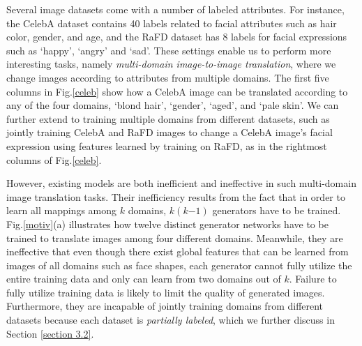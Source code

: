 \documentclass[10pt,twocolumn,letterpaper]{article}
\begin{document}
Several image datasets come with a number of labeled attributes. For instance, the CelebA\cite{liu2015faceattributes} dataset contains 40 labels related to facial attributes such as hair color, gender, and age, and the RaFD \cite{langner2010presentation} dataset has 8 labels for facial expressions such as `happy', `angry' and `sad'. These settings enable us to perform more interesting tasks, namely \textit{multi-domain image-to-image translation}, where we change images according to attributes from multiple domains. The first five columns in Fig.\thinspace\ref{celeb} show how a CelebA image can be translated according to any of the four domains, `blond hair', `gender', `aged', and `pale skin'. We can further extend to training multiple domains from different datasets, such as jointly training CelebA and RaFD images to change a CelebA image's facial expression using features learned by training on RaFD, as in the rightmost columns of Fig.\thinspace\ref{celeb}. %

However, existing models are both inefficient and ineffective in such multi-domain image translation tasks. Their inefficiency results from the fact that in order to learn all mappings among $k$ domains, $k(k\mathbb{-}1)$ generators have to be trained. Fig.\thinspace\ref{motiv}\thinspace(a) illustrates how twelve distinct generator networks have to be trained to translate images among four different domains. Meanwhile, they are ineffective that even though there exist global features that can be learned from images of all domains such as face shapes, each generator cannot fully utilize the entire training data and only can learn from two domains out of $k$. Failure to fully utilize training data is likely to limit the quality of generated images. Furthermore, they are incapable of jointly training domains from different datasets because each dataset is \textit{partially labeled}, which we further discuss in Section \ref{section 3.2}.
\end{document}
